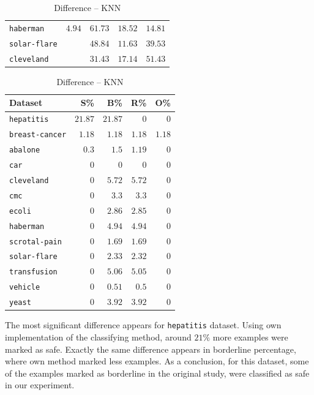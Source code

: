 \documentclass[12pt]{article}
\begin{document}
\begin{table}[H]
\begin{minipage}[t]{0.5\textwidth}
\begin{tabular}{lrrrr}
    \texttt{haberman} & $4.94$ & $61.73$ & $18.52$ & $14.81$ \\
    \texttt{solar-flare} & & $48.84$ & $11.63$ & $39.53$ \\
    \texttt{cleveland} & & $31.43$ & $17.14$ & $51.43$ \\
    \bottomrule
\end{tabular}
\caption{Original -- KNN}
\label{tab:knn_org}
\end{minipage}
\begin{minipage}{0.5\textwidth}
\centering
\begin{tabular}{lrrrr}
    \toprule
    Dataset & S\% & B\% & R\% & O\% \\ \midrule
    \texttt{hepatitis} & $21.87$ & $21.87$ & $0$ & $0$ \\
    \texttt{breast-cancer} & $1.18$ & $1.18$ & $1.18$ & $1.18$ \\
    \texttt{abalone} & $0.3$ & $1.5$ & $1.19$ & $0$\\
    \texttt{car} & $0$ & $0$ & $0$ & $0$ \\
    \texttt{cleveland} & $0$ & $5.72$ & $5.72$ & $0$ \\
    \texttt{cmc} & $0$ & $3.3$ & $3.3$ & $0$ \\
    \texttt{ecoli} & $0$ & $2.86$ & $2.85$ & $0$ \\
    \texttt{haberman} & $0$ & $4.94$ & $4.94$ & $0$ \\
    \texttt{scrotal-pain} & $0$ & $1.69$ & $1.69$ & $0$ \\
    \texttt{solar-flare} & $0$ & $2.33$ & $2.32$ & $0$ \\
    \texttt{transfusion} & $0$ & $5.06$ & $5.05$ & $0$ \\
    \texttt{vehicle} & $0$ & $0.51$ & $0.5$ & $0$ \\
    \texttt{yeast} & $0$ & $3.92$ & $3.92$ & $0$ \\
    \bottomrule
\end{tabular}
\caption{Difference -- KNN}
\label{tab:knn_diff}
\end{minipage}
\end{table}

The most significant difference appears for \texttt{hepatitis} dataset. Using own implementation of the classifying method, around $21\%$ more examples were marked as safe. Exactly the same difference appears in borderline percentage, where own method marked less examples. As a conclusion, for this dataset, some of the examples marked as borderline in the original study, were classified as safe in our experiment. 
\end{document}
